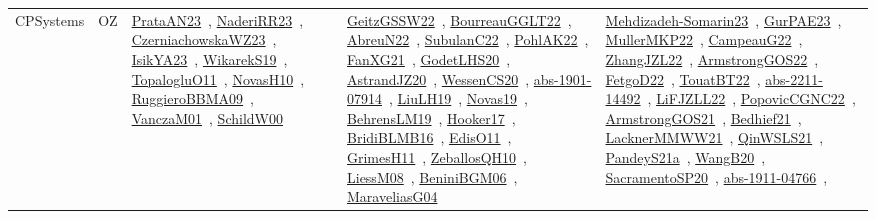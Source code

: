 {\begin{longtable}{lp{3cm}>{\raggedright\arraybackslash}p{6cm}>{\raggedright\arraybackslash}p{6cm}>{\raggedright\arraybackslash}p{8cm}}
CPSystems & OZ & \href{articles/PrataAN23.pdf}{PrataAN23}~\cite{PrataAN23}, \href{articles/NaderiRR23.pdf}{NaderiRR23}~\cite{NaderiRR23}, \href{articles/CzerniachowskaWZ23.pdf}{CzerniachowskaWZ23}~\cite{CzerniachowskaWZ23}, \href{articles/IsikYA23.pdf}{IsikYA23}~\cite{IsikYA23}, \href{articles/WikarekS19.pdf}{WikarekS19}~\cite{WikarekS19}, \href{articles/TopalogluO11.pdf}{TopalogluO11}~\cite{TopalogluO11}, \href{articles/NovasH10.pdf}{NovasH10}~\cite{NovasH10}, \href{articles/RuggieroBBMA09.pdf}{RuggieroBBMA09}~\cite{RuggieroBBMA09}, \href{papers/VanczaM01.pdf}{VanczaM01}~\cite{VanczaM01}, \href{articles/SchildW00.pdf}{SchildW00}~\cite{SchildW00} & \href{papers/GeitzGSSW22.pdf}{GeitzGSSW22}~\cite{GeitzGSSW22}, \href{articles/BourreauGGLT22.pdf}{BourreauGGLT22}~\cite{BourreauGGLT22}, \href{articles/AbreuN22.pdf}{AbreuN22}~\cite{AbreuN22}, \href{articles/SubulanC22.pdf}{SubulanC22}~\cite{SubulanC22}, \href{articles/PohlAK22.pdf}{PohlAK22}~\cite{PohlAK22}, \href{articles/FanXG21.pdf}{FanXG21}~\cite{FanXG21}, \href{papers/GodetLHS20.pdf}{GodetLHS20}~\cite{GodetLHS20}, \href{articles/AstrandJZ20.pdf}{AstrandJZ20}~\cite{AstrandJZ20}, \href{papers/WessenCS20.pdf}{WessenCS20}~\cite{WessenCS20}, \href{articles/abs-1901-07914.pdf}{abs-1901-07914}~\cite{abs-1901-07914}, \href{papers/LiuLH19.pdf}{LiuLH19}~\cite{LiuLH19}, \href{articles/Novas19.pdf}{Novas19}~\cite{Novas19}, \href{papers/BehrensLM19.pdf}{BehrensLM19}~\cite{BehrensLM19}, \href{papers/Hooker17.pdf}{Hooker17}~\cite{Hooker17}, \href{articles/BridiBLMB16.pdf}{BridiBLMB16}~\cite{BridiBLMB16}, \href{papers/EdisO11.pdf}{EdisO11}~\cite{EdisO11}, \href{papers/GrimesH11.pdf}{GrimesH11}~\cite{GrimesH11}, \href{articles/ZeballosQH10.pdf}{ZeballosQH10}~\cite{ZeballosQH10}, \href{articles/LiessM08.pdf}{LiessM08}~\cite{LiessM08}, \href{papers/BeniniBGM06.pdf}{BeniniBGM06}~\cite{BeniniBGM06}, \href{papers/MaraveliasG04.pdf}{MaraveliasG04}~\cite{MaraveliasG04} & \href{papers/Mehdizadeh-Somarin23.pdf}{Mehdizadeh-Somarin23}~\cite{Mehdizadeh-Somarin23}, \href{articles/GurPAE23.pdf}{GurPAE23}~\cite{GurPAE23}, \href{articles/MullerMKP22.pdf}{MullerMKP22}~\cite{MullerMKP22}, \href{articles/CampeauG22.pdf}{CampeauG22}~\cite{CampeauG22}, \href{papers/ZhangJZL22.pdf}{ZhangJZL22}~\cite{ZhangJZL22}, \href{papers/ArmstrongGOS22.pdf}{ArmstrongGOS22}~\cite{ArmstrongGOS22}, \href{articles/FetgoD22.pdf}{FetgoD22}~\cite{FetgoD22}, \href{papers/TouatBT22.pdf}{TouatBT22}~\cite{TouatBT22}, \href{articles/abs-2211-14492.pdf}{abs-2211-14492}~\cite{abs-2211-14492}, \href{papers/LiFJZLL22.pdf}{LiFJZLL22}~\cite{LiFJZLL22}, \href{papers/PopovicCGNC22.pdf}{PopovicCGNC22}~\cite{PopovicCGNC22}, \href{papers/ArmstrongGOS21.pdf}{ArmstrongGOS21}~\cite{ArmstrongGOS21}, \href{articles/Bedhief21.pdf}{Bedhief21}~\cite{Bedhief21}, \href{papers/LacknerMMWW21.pdf}{LacknerMMWW21}~\cite{LacknerMMWW21}, \href{articles/QinWSLS21.pdf}{QinWSLS21}~\cite{QinWSLS21}, \href{articles/PandeyS21a.pdf}{PandeyS21a}~\cite{PandeyS21a}, \href{papers/WangB20.pdf}{WangB20}~\cite{WangB20}, \href{articles/SacramentoSP20.pdf}{SacramentoSP20}~\cite{SacramentoSP20}, \href{articles/abs-1911-04766.pdf}{abs-1911-04766}~\cite{abs-1911-04766}, 
\end{longtable}}

